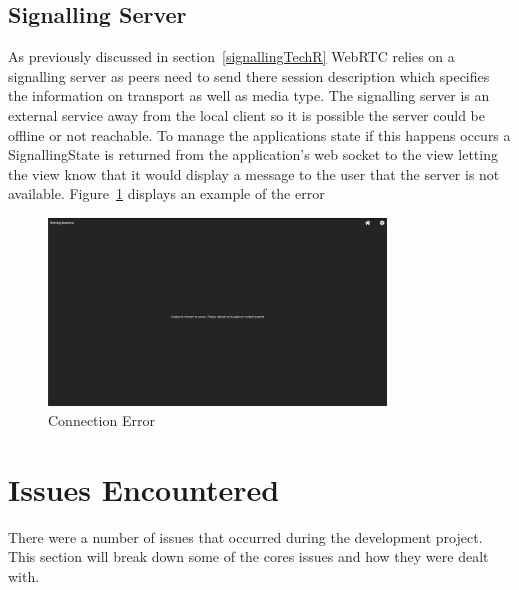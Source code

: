 \subsection{Signalling Server}
As previously discussed in section~\ref{signallingTechR} WebRTC relies on a signalling server as peers need to send there session description which specifies the information on transport as well as media type. The signalling server is an external service away from the local client so it is possible the server could be offline or not reachable. To manage the applications state if this happens occurs
a SignallingState is returned from the application's web socket to the view letting the view know that it would display a message to the user that the server is not available. Figure~\ref{image:connectionError} displays an example of the error

\begin{figure}[h!]
    \caption{Connection Error}
    \label{image:connectionError}
    \centering
    \includegraphics[width=0.8\textwidth]{images/screenshotsOfPages/connectionError.png}
\end{figure}

\section{Issues Encountered}
There were a number of issues that occurred during the development project. This section will break down some of the cores issues and how they were dealt with. 

